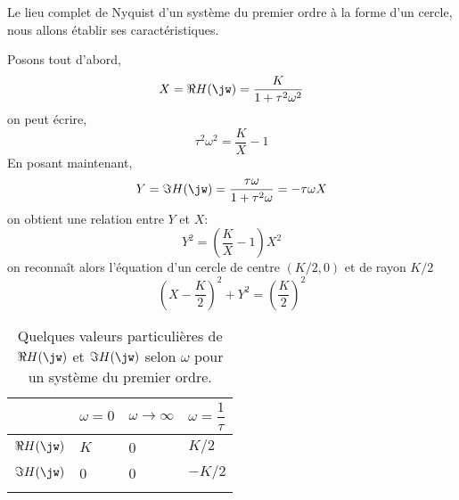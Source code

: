 Le lieu complet de Nyquist d'un système du premier ordre à la forme d'un cercle, nous allons établir
ses caractéristiques\cite{9782729860127}.

Posons tout d'abord,
$$
X=\Re{H(\jw)}=\dfrac{K}{1+\tau^2\omega^2}
$$
on peut écrire,
$$
\tau^2\omega^2=\dfrac{K}{X}-1
$$
En posant maintenant, 
$$
Y=\Im{H(\jw)}=\dfrac{\tau\omega}{1+\tau^2\omega}=-\tau\omega X
$$
on obtient une relation entre $Y$ et $X$:
$$
Y^2=\left(\dfrac{K}{X}-1\right)X^2
$$
on reconnaît alors l'équation d'un cercle de centre $(K/2,0)$ et de rayon $K/2$
$$
\left(X-\dfrac{K}{2}\right)^2+Y^2=\left(\dfrac{K}{2}\right)^2
$$
\begin{table}
    \begin{center}
    \begin{tabular}{M{2.0cm}M{2.0cm}M{2.0cm}M{2.0cm}}
        \hhline{====}
                                     & $\omega=0$  & $\omega\to\infty$    & $\omega=\dfrac{1}{\tau}$ \\[0em]
        \hline
        $\Re{H(\jw)}$     & $K$         & 0                    & $K/2$                    \\[0em]
        \hline
        $\Im{H(\jw)}$     & 0           & 0                    & $-K/2$                   \\[0em]
        \hhline{====}
    \end{tabular}
    \caption{Quelques valeurs particulières de $\Re{H(\jw)}$ et $\Im{H(\jw)}$
    selon $\omega$ pour un système du premier ordre\label{tab-nyquist-vp_1er}.}
    \end{center}
\end{table}

